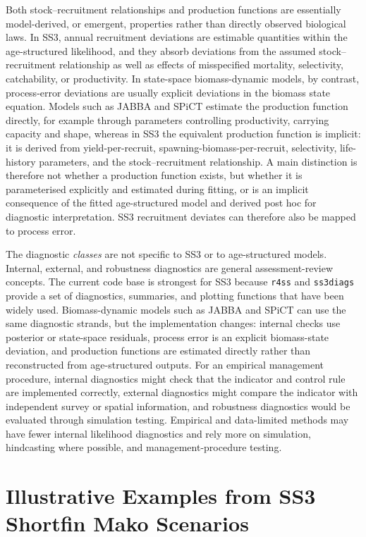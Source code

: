 \documentclass[11pt,a4paper]{article}
\begin{document}
Both stock--recruitment relationships and production functions are essentially model-derived, or emergent, properties rather than directly observed biological laws. In SS3, annual recruitment deviations are estimable quantities within the age-structured likelihood, and they absorb deviations from the assumed stock--recruitment relationship as well as effects of misspecified mortality, selectivity, catchability, or productivity. In state-space biomass-dynamic models, by contrast, process-error deviations are usually explicit deviations in the biomass state equation. Models such as JABBA and SPiCT estimate the production function directly, for example through parameters controlling productivity, carrying capacity and shape, whereas in SS3 the equivalent production function is implicit: it is derived from yield-per-recruit, spawning-biomass-per-recruit, selectivity, life-history parameters, and the stock--recruitment relationship. A main distinction is therefore not whether a production function exists, but whether it is parameterised explicitly and estimated during fitting, or is an implicit consequence of the fitted age-structured model and derived post hoc for diagnostic interpretation. SS3 recruitment deviates can therefore also be mapped to process error. 

The diagnostic \textit{classes} are not specific to SS3 or to age-structured models. Internal, external, and robustness diagnostics are general assessment-review concepts. The current code base is strongest for SS3 because \texttt{r4ss} and \texttt{ss3diags} provide a set of diagnostics, summaries, and plotting functions that have been widely used. Biomass-dynamic models such as JABBA and SPiCT can use the same diagnostic strands, but the implementation changes: internal checks use posterior or state-space residuals, process error is an explicit biomass-state deviation, and production functions are estimated directly rather than reconstructed from age-structured outputs. For an empirical management procedure, internal diagnostics might check that the indicator and control rule are implemented correctly, external diagnostics might compare the indicator with independent survey or spatial information, and robustness diagnostics would be evaluated through simulation testing. Empirical and data-limited methods may have fewer internal likelihood diagnostics and rely more on simulation, hindcasting where possible, and management-procedure testing.

\section{Illustrative Examples from SS3 Shortfin Mako Scenarios}
\end{document}
